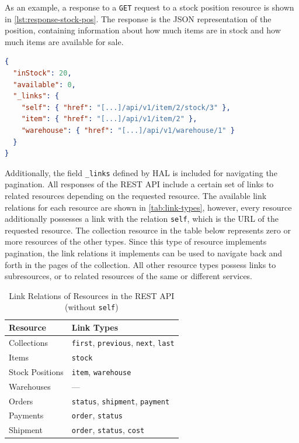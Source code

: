 As an example, a response to a \texttt{GET} request to a stock position resource is shown in \autoref{lst:response-stock-pos}.
The response is the \ac{JSON} representation of the position, containing information about how much items are in stock and how much items are available for sale.

\begin{lstlisting}[caption={Response to Fetching the Stock Position Collection}, language=json, label={lst:response-stock-pos}]
{
  "inStock": 20,
  "available": 0,
  "_links": {
    "self": { "href": "[...]/api/v1/item/2/stock/3" },
    "item": { "href": "[...]/api/v1/item/2" },
    "warehouse": { "href": "[...]/api/v1/warehouse/1" }
  }
}
\end{lstlisting}

Additionally, the field \texttt{\_links} defined by \ac{HAL} is included for navigating the pagination.
All responses of the \ac{REST} \ac{API} include a certain set of links to related resources depending on the requested resource.
The available link relations for each resource are shown in \autoref{tab:link-types}, however, every resource additionally possesses a link with the relation \texttt{self}, which is the URL of the requested resource.
The collection resource in the table below represents zero or more resources of the other types.
Since this type of resource implements pagination, the link relations it implements can be used to navigate back and forth in the pages of the collection.
All other resource types possess links to subresources, or to related resources of the same or different services.

\begin{table}[ht]
    \centering
    \begin{tabular}{@{}ll@{}}
        \toprule
        \textbf{Resource}   & \textbf{Link Types} \\
        \midrule
        Collections         & \texttt{first}, \texttt{previous}, \texttt{next}, \texttt{last} \\
        \midrule
        Items               & \texttt{stock} \\
        Stock Positions     & \texttt{item}, \texttt{warehouse} \\
        Warehouses          & --- \\
        \midrule
        Orders              & \texttt{status}, \texttt{shipment}, \texttt{payment} \\
        \midrule
        Payments            & \texttt{order}, \texttt{status} \\
        \midrule
        Shipment            & \texttt{order}, \texttt{status}, \texttt{cost} \\
        \bottomrule
    \end{tabular}
    \caption{Link Relations of Resources in the \ac{REST} \ac{API} (without \texttt{self})}\label{tab:link-types}
\end{table}

